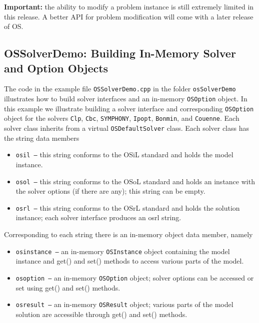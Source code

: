 \documentclass[11pt]{article}
\renewcommand{\_}{{\char"5F}}
\renewcommand{\{}{{\char"7B}}
\renewcommand{\}}{{\char"7D}}
\renewcommand{\^}{{\char"0D}}
\renewcommand{\'}{{\char"0D}}
\begin{document}
\begin{enumerate}[Step 1:]
\vskip 8pt

{\bf Important:} the ability to modify a problem instance is still extremely limited in this release.
A better API for problem modification will come with a later release of OS.



\subsection{OSSolverDemo: Building In-Memory Solver and Option Objects}\label{section:exampleOSSolverDemo}

The code in the  example file {\tt OSSolverDemo.cpp} in the folder {\tt osSolverDemo}  illustrates  how to build solver interfaces and  an in-memory {\tt OSOption} object. In this example we  illustrate building a solver interface and corresponding {\tt OSOption} object for the solvers {\tt Clp}, {\tt Cbc}, {\tt SYMPHONY}, {\tt Ipopt},   {\tt Bonmin}, and {\tt Couenne}.   Each solver class inherits from a virtual {\tt OSDefaultSolver} class. Each solver class has the string data members

\begin{itemize}
\item {\tt osil --} this string conforms to the OSiL standard and holds the model instance.

\item {\tt osol --} this string conforms to the OSoL standard and holds an instance with the 
solver options (if there are any); this string can be empty.

\item {\tt osrl --} this string conforms to the OSrL standard and holds the solution instance; 
each solver interface produces an osrl string.
\end{itemize}

Corresponding to each string there is an in-memory object data member, namely

\begin{itemize}
\item {\tt osinstance --}  an in-memory {\tt OSInstance} object containing the model instance
and get() and set() methods to access various parts of the model.


\item {\tt osoption --} an in-memory {\tt OSOption} object; solver options can be accessed or 
set using get() and set() methods.


\item {\tt osresult --}  an in-memory {\tt OSResult} object; various parts of the model solution  
are accessible through get() and set() methods.
\end{itemize}



\end{enumerate}
\end{document}
